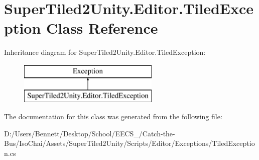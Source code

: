 \hypertarget{class_super_tiled2_unity_1_1_editor_1_1_tiled_exception}{}\section{Super\+Tiled2\+Unity.\+Editor.\+Tiled\+Exception Class Reference}
\label{class_super_tiled2_unity_1_1_editor_1_1_tiled_exception}
Inheritance diagram for Super\+Tiled2\+Unity.\+Editor.\+Tiled\+Exception\+:\begin{figure}[H]
\begin{center}
\leavevmode
\includegraphics[height=2.000000cm]{class_super_tiled2_unity_1_1_editor_1_1_tiled_exception}
\end{center}
\end{figure}


The documentation for this class was generated from the following file\+:\begin{DoxyCompactItemize}
\item 
D\+:/\+Users/\+Bennett/\+Desktop/\+School/\+E\+E\+C\+S\+\_/\+Catch-\/the-\/\+Bus/\+Iso\+Chai/\+Assets/\+Super\+Tiled2\+Unity/\+Scripts/\+Editor/\+Exceptions/Tiled\+Exception.\+cs\end{DoxyCompactItemize}
